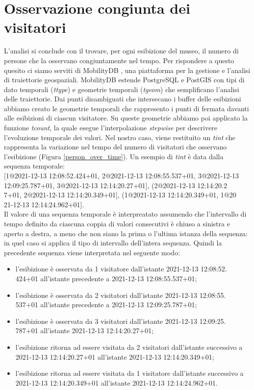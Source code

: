 \documentclass[12pt]{article}
\begin{document}
\section{Osservazione congiunta dei visitatori}
L'analisi si conclude con il trovare, per ogni esibizione del museo, il numero di persone che la osservano congiuntamente nel tempo.
Per rispondere a questo quesito ci siamo serviti di MobilityDB \cite{MobilityDBTODS2020}, una piattaforma per la gestione e l'analisi di traiettorie geospaziali.
MobilityDB estende PostgreSQL e PostGIS con tipi di dato temporali (\emph{ttype}) e geometrie temporali (\emph{tgeom}) che semplificano l'analisi delle traiettorie.
Dai punti disambiguati che intersecano i buffer delle esibizioni abbiamo creato le geometrie temporali che rappresento i punti di fermata davanti alle esibizioni di ciascun visitatore.
Su queste geometrie abbiamo poi applicato la funzione \emph{tcount}, la quale esegue l'interpolazione \emph{stepwise} per descrivere l'evoluzione temporale dei valori.
Nel nostro caso, viene restituito un \emph{tint} che rappresenta la variazione nel tempo del numero di visitatori che osservano l'esibizione (Figura \ref{person_over_time}).
Un esempio di \emph{tint} è data dalla sequenza temporale: \\
{[1@2021-12-13 12:08:52.424+01, 2@2021-12-13 12:08:55.537+01, 3@2021-12-13 12:09:25.787+01, 3@2021-12-13 12:14:20.27+01], (2@2021-12-13 12:14:20.2\\7+01, 2@2021-12-13 12:14:20.349+01], (1@2021-12-13 12:14:20.349+01, 1@20\\21-12-13 12:14:24.962+01]}.\\
Il valore di una sequenza temporale è interpreatato assumendo che l'intervallo di tempo definito da ciascuna coppia di valori consecutivi è chiuso a sinistra e aperto a destra, a meno che non siano la prima o l'ultima istanza della sequenza: in quel caso si applica il tipo di intervallo dell'intera sequenza.
Quindi la precedente sequenza viene interpretata nel seguente modo:
\begin{itemize}
    \item l'esibizione è osservata da 1 visitatore dall'istante 2021-12-13 12:08:52.\\424+01 all'istante precedente a 2021-12-13 12:08:55.537+01;
    \item l'esibizione è osservata da 2 visitatori dall'istante 2021-12-13 12:08:55.\\537+01 all'istante precedente a 2021-12-13 12:09:25.787+01;
    \item l'esibizione è osservata da 3 visitatori dall'istante 2021-12-13 12:09:25.\\787+01 all'istante 2021-12-13 12:14:20.27+01;
    \item l'esibizione ritorna ad essere visitata da 2 visitatori dall'istante successivo a 2021-12-13 12:14:20.27+01 all'istante 2021-12-13 12:14:20.349+01;
    \item l'esibizione ritorna ad essere visitata da 1 visitatore dall'istante successivo a 2021-12-13 12:14:20.349+01 all'istante 2021-12-13 12:14:24.962+01.
\end{itemize}
\end{document}
